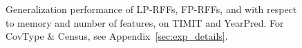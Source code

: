 \begin{figure}
\begin{small}
\begin{tabular}{@{\hskip -0.05in}c@{\hskip -0.1in}c@{\hskip -0.1in}c@{\hskip -0.1in}c@{\hskip -0.05in}}
	\end{tabular}
	\end{small}
	\caption{Generalization performance of LP-RFFs, FP-RFFs, and \Nystrom with respect to memory and number of features, on TIMIT and YearPred.  For CovType \& Census, see Appendix~\ref{sec:exp_details}.
}
	\label{fig:generalization_col}
\end{figure}



